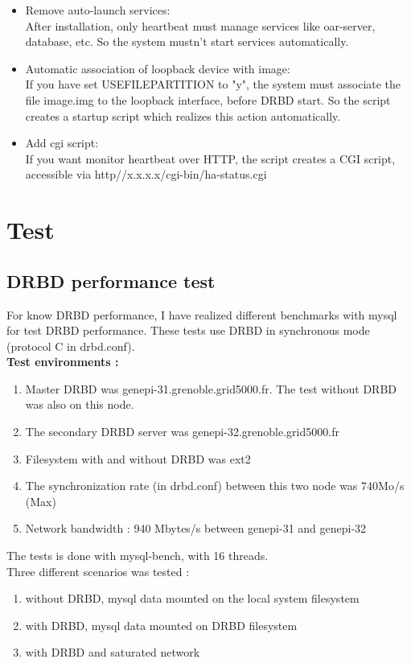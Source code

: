 \documentclass[a4paper,10pt]{report}
\begin{document}
\begin{itemize}
 \item Remove auto-launch services:\\
After installation, only heartbeat must manage services like oar-server, database, etc. So the system mustn't start services automatically.
 \item Automatic association of loopback device with image:\\
If you have set USEFILEPARTITION to "y", the system must associate the file image.img to the loopback interface, before DRBD start. So the script creates a startup script which realizes this action automatically.
 \item Add cgi script:\\
If you want monitor heartbeat over HTTP, the script creates a CGI script, accessible via http//x.x.x.x/cgi-bin/ha-status.cgi
\end{itemize}





\chapter{Test}

\section{DRBD performance test}

For know DRBD performance, I have realized different benchmarks with mysql for test DRBD performance. These tests use DRBD in synchronous mode (protocol C in drbd.conf).\\
\textbf{Test environments :}
\begin{enumerate}
 \item Master DRBD was genepi-31.grenoble.grid5000.fr. The test without DRBD was also on this node.
 \item The secondary DRBD server was genepi-32.grenoble.grid5000.fr 
 \item Filesystem with and without DRBD was ext2
 \item The synchronization rate (in drbd.conf) between this two node was 740Mo/s (Max)
 \item Network bandwidth : 940 Mbytes/s between genepi-31 and genepi-32
\end{enumerate}
The tests is done with mysql-bench, with 16 threads.\\

Three different scenarios was tested :
\begin{enumerate}
 \item without DRBD, mysql data mounted on the local system filesystem 
 \item with DRBD, mysql data mounted on DRBD filesystem 
 \item with DRBD and saturated network 
\end{enumerate}
\end{document}
